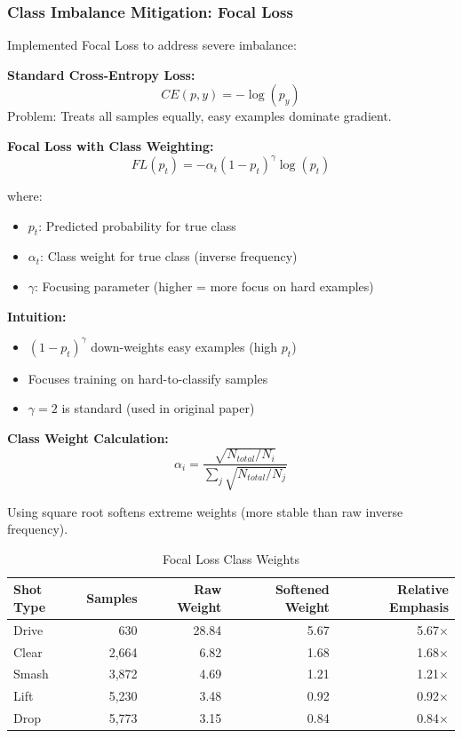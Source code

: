 \documentclass[11pt,a4paper]{article}
\begin{document}
\subsubsection{Class Imbalance Mitigation: Focal Loss}

Implemented Focal Loss \cite{FocalLoss} to address severe imbalance:

\textbf{Standard Cross-Entropy Loss:}
\begin{equation}
CE(p, y) = -\log(p_y)
\end{equation}
Problem: Treats all samples equally, easy examples dominate gradient.

\textbf{Focal Loss with Class Weighting:}
\begin{equation}
FL(p_t) = -\alpha_t (1 - p_t)^\gamma \log(p_t)
\end{equation}

where:
\begin{itemize}
\item $p_t$: Predicted probability for true class
\item $\alpha_t$: Class weight for true class (inverse frequency)
\item $\gamma$: Focusing parameter (higher = more focus on hard examples)
\end{itemize}

\textbf{Intuition:}
\begin{itemize}
\item $(1 - p_t)^\gamma$ down-weights easy examples (high $p_t$)
\item Focuses training on hard-to-classify samples
\item $\gamma = 2$ is standard (used in original paper)
\end{itemize}

\textbf{Class Weight Calculation:}
\begin{equation}
\alpha_i = \frac{\sqrt{N_{total} / N_i}}{\sum_j \sqrt{N_{total} / N_j}}
\end{equation}

Using square root softens extreme weights (more stable than raw inverse frequency).

\begin{table}[H]
\centering
\caption{Focal Loss Class Weights}
\begin{tabular}{lrrrr}
\toprule
Shot Type & Samples & Raw Weight & Softened Weight & Relative Emphasis \\
\midrule
Drive & 630 & 28.84 & 5.67 & 5.67$\times$ \\
Clear & 2,664 & 6.82 & 1.68 & 1.68$\times$ \\
Smash & 3,872 & 4.69 & 1.21 & 1.21$\times$ \\
Lift & 5,230 & 3.48 & 0.92 & 0.92$\times$ \\
Drop & 5,773 & 3.15 & 0.84 & 0.84$\times$ \\
\bottomrule
\end{tabular}
\end{table}
\end{document}
